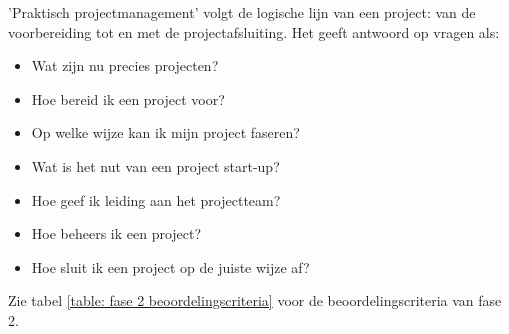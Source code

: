 'Praktisch projectmanagement' volgt de logische lijn van een project:
van de voorbereiding tot en met de projectafsluiting. Het geeft antwoord op
vragen als:

\begin{itemize}
    \item Wat zijn nu precies projecten?
    \item Hoe bereid ik een project voor?
    \item Op welke wijze kan ik mijn project faseren?
    \item Wat is het nut van een project start-up?
    \item Hoe geef ik leiding aan het projectteam?
    \item Hoe beheers ik een project?
    \item Hoe sluit ik een project op de juiste wijze af?
\end{itemize}

Zie tabel \ref{table: fase 2 beoordelingscriteria} voor de beoordelingscriteria van fase 2.

